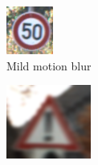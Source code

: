 \begin{figure}[H]
    \centering
    \begin{subfigure}{0.25\textwidth}
        \includegraphics[width=\linewidth]{images/figure12/1.png}
        \caption{Mild motion blur}
        \label{fig:subfig4}
    \end{subfigure}
    \begin{subfigure}{0.3\textwidth}
        \includegraphics[width=\linewidth]{images/figure12/2.png}

\end{subfigure}
\end{figure}
